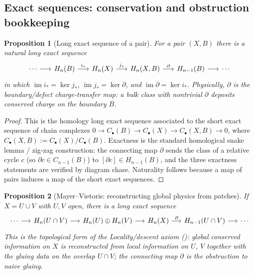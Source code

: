 \documentclass[12pt]{article}
\newtheorem{proposition}[proposition]{Proposition}
\theoremstyle{definition}
\theoremstyle{remark}
\newcommand{\im}{\operatorname{im}}
\begin{document}
\subsection{Exact sequences: conservation and obstruction bookkeeping}

\begin{proposition}[Long exact sequence of a pair]
\label{prop:les}
For a pair $(X,B)$ there is a natural long exact sequence
\[
\begin{tikzcd}[column sep=1.6em]
\cdots \arrow[r] & H_n(B) \arrow[r, "i_*"] & H_n(X) \arrow[r, "j_*"] &
H_n(X,B) \arrow[r, "\partial"] & H_{n-1}(B) \arrow[r] & \cdots
\end{tikzcd}
\]
in which $\im i_* = \ker j_*$, $\im j_*=\ker\partial$, and
$\im\partial=\ker i_*$. Physically, $\partial$ is the boundary/defect
charge-transfer map: a bulk class with nontrivial $\partial$ deposits conserved
charge on the boundary $B$.
\end{proposition}

\begin{proof}
This is the homology long exact sequence associated to the short exact sequence of
chain complexes $0\to C_\bullet(B)\to C_\bullet(X)\to C_\bullet(X,B)\to 0$, where
$C_\bullet(X,B):=C_\bullet(X)/C_\bullet(B)$. Exactness is the standard homological
snake lemma / zig-zag construction: the connecting map $\partial$ sends the class
of a relative cycle $c$ (so $\partial c\in C_{n-1}(B)$) to $[\partial c]\in
H_{n-1}(B)$, and the three exactness statements are verified by diagram chase.
Naturality follows because a map of pairs induces a map of the short exact
sequences.
\end{proof}

\begin{proposition}[Mayer--Vietoris: reconstructing global physics from patches]
\label{prop:mv}
If $X=U\cup V$ with $U,V$ open, there is a long exact sequence
\[
\begin{tikzcd}[column sep=1.35em]
\cdots \arrow[r] & H_n(U\cap V) \arrow[r] & H_n(U)\oplus H_n(V) \arrow[r] &
H_n(X) \arrow[r, "\partial"] & H_{n-1}(U\cap V) \arrow[r] & \cdots
\end{tikzcd}
\]
This is the topological form of the Locality/descent axiom
(): global conserved information on $X$ is reconstructed from
local information on $U$, $V$ together with the gluing data on the overlap
$U\cap V$; the connecting map $\partial$ is the obstruction to naive gluing.
\end{proposition}
\end{document}
